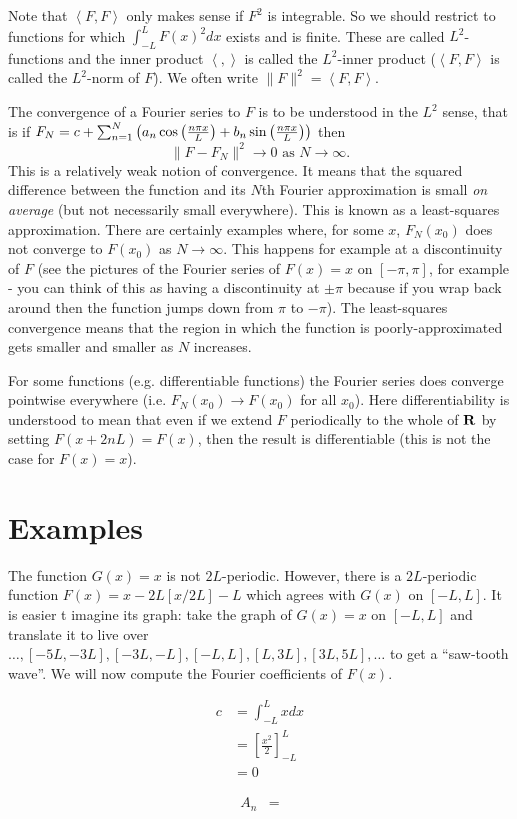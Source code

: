 Note that $\left\langle F,F\right\rangle$ only makes sense if $F^2$ is integrable. So we should restrict to functions for which $\int_{-L}^LF(x)^2dx$ exists and is finite. These are called $L^2$-functions and the inner product $\left\langle,\right\rangle$ is called the $L^2$-inner product ($\left\langle F,F\right\rangle$ is called the $L^2$-norm of $F$). We often write $\|F\|^2=\left\langle F,F\right\rangle$.

The convergence of a Fourier series to $F$ is to be understood in the $L^2$ sense, that is if $F_N=c+\sum_{n=1}^N\left(a_n\cos\left(\frac{n \pi x}{L}\right)+b_n\sin\left(\frac{n \pi x}{L}\right)\right)$ then
\[\|F-F_N\|^2\to 0\mbox{ as }N\to\infty.\]
This is a relatively weak notion of convergence. It means that the squared difference between the function and its $N$th Fourier approximation is small {\em on average} (but not necessarily small everywhere). This is known as a least-squares approximation. There are certainly examples where, for some $x$, $F_N(x_0)$ does not converge to $F(x_0)$ as $N\to\infty$. This happens for example at a discontinuity of $F$ (see the pictures of the Fourier series of $F(x)=x$ on $[-\pi,\pi]$, for example - you can think of this as having a discontinuity at $\pm\pi$ because if you wrap back around then the function jumps down from $\pi$ to $-\pi$). The least-squares convergence means that the region in which the function is poorly-approximated gets smaller and smaller as $N$ increases.

For some functions (e.g. differentiable functions) the Fourier series does converge pointwise everywhere (i.e. $F_N(x_0)\to F(x_0)$ for all $x_0$). Here differentiability is understood to mean that even if we extend $F$ periodically to the whole of $\mathbf{R}$ by setting $F(x+2nL)=F(x)$, then the result is differentiable (this is not the case for $F(x)=x$).



\iffalse
\section{Examples}

\begin{exm}
The function $G(x)=x$ is not $2L$-periodic. However, there is a $2L$-periodic function $F(x)=x-2L[x/2L]-L$ which agrees with $G(x)$ on $[-L,L]$. It is easier t imagine its graph: take the graph of $G(x)=x$ on $[-L,L]$ and translate it to live over $\ldots,[-5L,-3L],[-3L,-L],[-L,L],[L,3L],[3L,5L],\ldots$ to get a ``saw-tooth wave''. We will now compute the Fourier coefficients of $F(x)$.

\begin{align*}
  c  & = \int_{-L}^Lxdx\\
     & = \left[\frac{x^2}{2}\right]_{-L}^L\\
     & = 0
\end{align*}

\begin{align*}
  A_n &=
\end{align*}
\end{exm}



